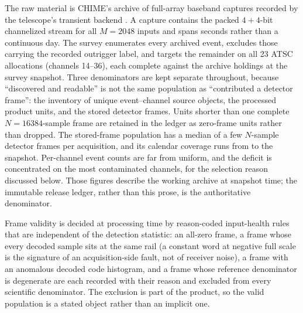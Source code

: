 The raw material is CHIME's archive of full-array baseband captures recorded by
the telescope's transient backend \cite{amiri2018frb}.  A capture contains the
packed $4{+}4$-bit channelized stream for all $M = 2048$ inputs and spans
seconds rather than a continuous day.  The survey enumerates every archived
event, excludes those carrying the recorded outrigger label, and targets the
remainder on all 23 ATSC allocations (channels 14--36), each complete against
the archive holdings at the survey snapshot.  Three denominators are kept
separate throughout, because ``discovered and readable'' is not the same
population as ``contributed a detector frame'': the inventory of unique
event--channel source objects, the processed product units, and the stored
detector frames.  Units shorter than one complete $N = 16384$-sample frame are
retained in the ledger as zero-frame units rather than dropped.  The
stored-frame population has a median of a few $N$-sample detector frames per
acquisition, and its calendar coverage runs from  to the
snapshot.  Per-channel event counts are far from uniform, and the deficit is
concentrated on the most contaminated channels, for the selection reason
discussed below.  Those figures describe the working archive at snapshot time;
the immutable release ledger, rather than this prose, is the authoritative
denominator.

Frame validity is decided at processing time by reason-coded input-health rules
that are independent of the detection statistic: an all-zero frame, a frame
whose every decoded sample sits at the same rail (a constant word at negative
full scale is the signature of an acquisition-side fault, not of receiver
noise), a frame with an anomalous decoded code histogram, and a frame whose
reference denominator is degenerate are each recorded with their reason and
excluded from every scientific denominator.  The exclusion is part of the
product, so the valid population is a stated object rather than an implicit one.

